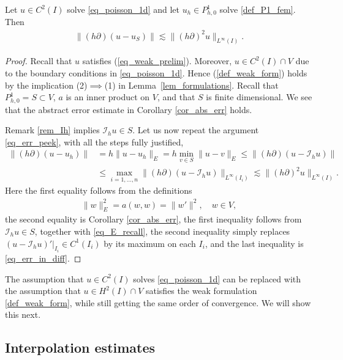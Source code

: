\documentclass[12pt,oneside]{amsart}
\def\I{\mathcal I}
\begin{document}
\begin{theorem}
Let $u \in C^2(I)$ solve \eqref{eq_poisson_1d}
and let $u_h \in P_{h,0}^1$ solve \eqref{def_P1_fem}.
Then
    \begin{align*}
\|(h\partial)(u-u_S)\|
\lesssim
\|(h \partial)^2 u\|_{L^\infty(I)}.
    \end{align*}
\end{theorem}
\begin{proof}
Recall that $u$ satisfies (\ref{eq_weak_prelim}).
Moreover, $u \in C^2(I) \cap V$ due to the boundary conditions in \eqref{eq_poisson_1d}. Hence (\ref{def_weak_form}) holds by the implication (2)$\implies$(1) in Lemma~\ref{lem_formulations}.
Recall that $P_{h,0}^1 = S \subset V$,
$a$ is an inner product on $V$, and that $S$ is finite dimensional. 
We see that the abstract error estimate in Corollary \ref{cor_abs_err} holds.

Remark \ref{rem_Ih} implies $\I_h u \in S$. Let us now repeat the argument \eqref{eq_err_peek}, with all the steps fully justified,
    \begin{align*}
\|(h\partial)(u-u_h)\|
&= 
h\|u-u_h\|_E 
= 
h \min_{v \in S}\|u-v\|_E
\le 
\|(h\partial)(u-\I_h u)\|
\\&\le
\max_{i=1,\dots,n}\|(h\partial)(u - \I_h u)\|_{L^\infty(I_i)} 
\lesssim
\|(h \partial)^2 u\|_{L^\infty(I)}.
    \end{align*}
Here the first equality follows from the definitions 
    \begin{align}\label{eq_E_recall}
\|w\|_E^2 = a(w,w) = \|w'\|^2, \quad w \in V,
    \end{align}
the second equality is Corollary \ref{cor_abs_err},
the first inequality follows from $\I_h u \in S$, together with \eqref{eq_E_recall}, 
the second inequality simply replaces $(u - \I_h u)'|_{I_i} \in C^1(I_i)$ by its maximum on each $I_i$, and the last inequality is \eqref{eq_err_in_diff}.
\end{proof}

The assumption that $u \in C^2(I)$ solves \eqref{eq_poisson_1d}
can be replaced with the assumption that $u \in H^2(I) \cap V$ satisfies the weak formulation \eqref{def_weak_form},
while still getting the same order of convergence. We will show this next. 

\subsection{Interpolation estimates\label{sec_interp}}
\end{document}
